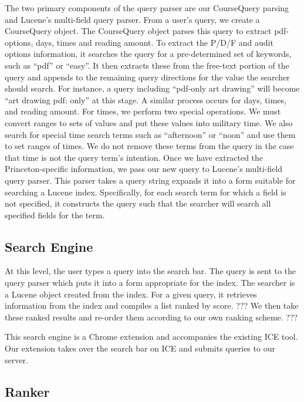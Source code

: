 \documentclass[12pt,letterpaper]{article}
\begin{document}
The two primary components of the query parser are our CourseQuery parsing and Lucene's multi-field query parser. From a user's query, we create a CourseQuery object. The CourseQuery object parses this query to extract pdf-options, days, times and reading amount. To extract the P/D/F and audit options information, it searches the query for a pre-determined set of keywords, such as ``pdf'' or ``easy''. It then extracts these from the free-text portion of the query and appends to the remaining query directions for the value the searcher should search. For instance, a query including ``pdf-only art drawing'' will become ``art drawing pdf: only'' at this stage. A similar process occurs for days, times, and reading amount. For times, we perform two special operations. We must convert ranges to sets of values and put these values into military time. We also search for special time search terms such as ``afternoon'' or ``noon'' and use them to set ranges of times. We do not remove these terms from the query in the case that time is not the query term's intention. Once we have extracted the Princeton-specific information, we pass our new query to Lucene's multi-field query parser. This parser takes a query string expands it into a form suitable for searching a Lucene index. Specifically, for each search term for which a field is not specified, it constructs the query such that the searcher will search all specified fields for the term. 
	
\subsection{Search Engine}
At this level, the user types a query into the search bar. The query is sent to the query parser which puts it into a form appropriate for the index. The searcher is a Lucene object created from the index. For a given query, it retrieves information from the index and compiles a list ranked by score. ??? We then take these ranked results and re-order them according to our own ranking scheme. ???

This search engine is a Chrome extension and accompanies the existing ICE tool. Our extension takes over the search bar on ICE and submits queries to our server. 
				
		
\subsection{Ranker}
\end{document}

